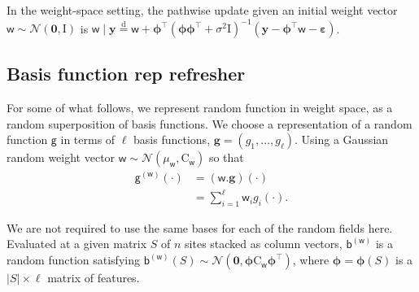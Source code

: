 \documentclass{article}
\newcommand\numberthis{\addtocounter{equation}{1}\tag{\theequation}}
\newcommand{\vv}[1]{\boldsymbol{#1}}
\newcommand{\mm}[1]{\mathrm{#1}}
\newcommand{\rv}[1]{\mathsf{#1}}
\newcommand{\vrv}[1]{\vv{\rv{#1}}}
\newcommand{\dist}[1]{\mathcal{#1}}
\newcommand{\set}[1]{#1}
\newcommand{\op}[1]{\mathscr{#1}}
\newcommand{\disteq}{\stackrel{\mathrm{d}}{=}}
\newcommand{\gvn}{\mid}
\newcommand{\lat}{\rv{b}}   %
\begin{document}
In the weight-space setting, the pathwise update given an initial weight vector \(\vrv{w} \sim \dist{N}(\mathbf{0}, \mm{I})\) is  \(\vrv{w} \gvn \boldsymbol{y} \disteq \vrv{w}+\vv{\phi}^{\top}\left(\vv{\phi} \vv{\phi}^{\top}+\sigma^{2} \mm{I}\right)^{-1}\left(\boldsymbol{y}-\vv{\phi}^{\top} \vrv{w}-\boldsymbol{\varepsilon}\right)\).

\subsection{Basis function rep refresher}

For some of what follows, we represent random function in weight space, as a random superposition of basis functions.
We choose a representation of a random function \(\rv{g}\) in terms of \(\ell\) basis functions, \(\vv{g}=\left(g_{1}, \ldots, g_{\ell}\right)\).
Using a Gaussian random weight vector \(\vrv{w} \sim \dist{N}\left(\mu_{\vrv{w}}, \mm{C}_{\vrv{w}}\right)\) so that
\begin{align*}
\rv{g}^{(\vrv{w})}(\cdot)&= (\vrv{w}.\vv{g})(\cdot) \label{eq:weightspace}\\
&=\sum_{i=1}^{\ell} \rv{w}_{i} g_{i}(\cdot).
\end{align*}

We are not required to use the same bases for each of the random fields here.
Evaluated at a given matrix \(\set{S}\) of \(n\) sites stacked as column vectors,
\(\lat^{(\vrv{w})}\) is a random function satisfying \(\lat^{(\vrv{w})}(\set{S}) \sim \dist{N}\left(\mathbf{0}, \vv{\phi} \mm{C}_{\vrv{w}} \vv{\phi}^{\top}\right)\), where \(\vv{\phi}=\vv{\phi}(\set{S})\) is a \(|\set{S}| \times \ell\) matrix of features.




\end{document}

